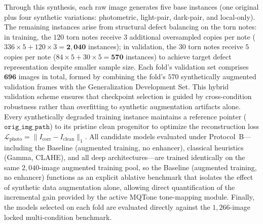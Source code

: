 \documentclass[final,5p,times,twocolumn,authoryear]{elsarticle}
\begin{document}
Through this synthesis, each raw image generates five base instances (one original plus four synthetic variations: photometric, light-pair, dark-pair, and local-only). The remaining instances arise from structural defect balancing on the torn notes: in training, the $120$ torn notes receive $3$ additional oversampled copies per note ($336 \times 5 + 120 \times 3 = \mathbf{2{,}040}$ instances); in validation, the $30$ torn notes receive $5$ copies per note ($84 \times 5 + 30 \times 5 = \mathbf{570}$ instances) to achieve target defect representation despite smaller sample size. Each fold's validation set comprises $\mathbf{696}$ images in total, formed by combining the fold's $570$ synthetically augmented validation frames with the Generalization Development Set. This hybrid validation scheme ensures that checkpoint selection is guided by cross-condition robustness rather than overfitting to synthetic augmentation artifacts alone. Every synthetically degraded training instance maintains a reference pointer ($\texttt{orig\_img\_path}$) to its pristine clean progenitor to optimize the reconstruction loss $\mathcal{L}_{\text{photo}} = \| I_{\text{corr}} - I_{\text{clean}} \|_1$. All candidate models evaluated under Protocol~B---including the Baseline (augmented training, no enhancer), classical heuristics (Gamma, CLAHE), and all deep architectures---are trained identically on the same $2{,}040$-image augmented training pool, so the Baseline (augmented training, no enhancer) functions as an explicit ablative benchmark that isolates the effect of synthetic data augmentation alone, allowing direct quantification of the incremental gain provided by the active MQTone tone-mapping module. Finally, the models selected on each fold are evaluated directly against the $1{,}266$-image locked multi-condition benchmark.
\end{document}
